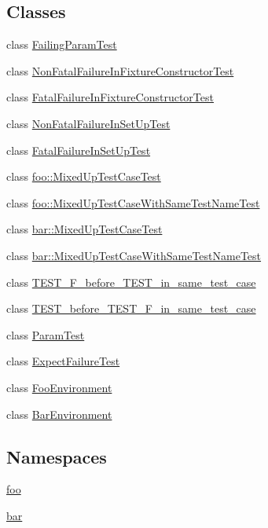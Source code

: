 \subsection*{Classes}
\begin{DoxyCompactItemize}
\item 
class \mbox{\hyperlink{classFailingParamTest}{Failing\+Param\+Test}}
\item 
class \mbox{\hyperlink{classNonFatalFailureInFixtureConstructorTest}{Non\+Fatal\+Failure\+In\+Fixture\+Constructor\+Test}}
\item 
class \mbox{\hyperlink{classFatalFailureInFixtureConstructorTest}{Fatal\+Failure\+In\+Fixture\+Constructor\+Test}}
\item 
class \mbox{\hyperlink{classNonFatalFailureInSetUpTest}{Non\+Fatal\+Failure\+In\+Set\+Up\+Test}}
\item 
class \mbox{\hyperlink{classFatalFailureInSetUpTest}{Fatal\+Failure\+In\+Set\+Up\+Test}}
\item 
class \mbox{\hyperlink{classfoo_1_1MixedUpTestCaseTest}{foo\+::\+Mixed\+Up\+Test\+Case\+Test}}
\item 
class \mbox{\hyperlink{classfoo_1_1MixedUpTestCaseWithSameTestNameTest}{foo\+::\+Mixed\+Up\+Test\+Case\+With\+Same\+Test\+Name\+Test}}
\item 
class \mbox{\hyperlink{classbar_1_1MixedUpTestCaseTest}{bar\+::\+Mixed\+Up\+Test\+Case\+Test}}
\item 
class \mbox{\hyperlink{classbar_1_1MixedUpTestCaseWithSameTestNameTest}{bar\+::\+Mixed\+Up\+Test\+Case\+With\+Same\+Test\+Name\+Test}}
\item 
class \mbox{\hyperlink{classTEST__F__before__TEST__in__same__test__case}{T\+E\+S\+T\+\_\+\+F\+\_\+before\+\_\+\+T\+E\+S\+T\+\_\+in\+\_\+same\+\_\+test\+\_\+case}}
\item 
class \mbox{\hyperlink{classTEST__before__TEST__F__in__same__test__case}{T\+E\+S\+T\+\_\+before\+\_\+\+T\+E\+S\+T\+\_\+\+F\+\_\+in\+\_\+same\+\_\+test\+\_\+case}}
\item 
class \mbox{\hyperlink{classParamTest}{Param\+Test}}
\item 
class \mbox{\hyperlink{classExpectFailureTest}{Expect\+Failure\+Test}}
\item 
class \mbox{\hyperlink{classFooEnvironment}{Foo\+Environment}}
\item 
class \mbox{\hyperlink{classBarEnvironment}{Bar\+Environment}}
\end{DoxyCompactItemize}
\subsection*{Namespaces}
\begin{DoxyCompactItemize}
\item 
 \mbox{\hyperlink{namespacefoo}{foo}}
\item 
 \mbox{\hyperlink{namespacebar}{bar}}
\end{DoxyCompactItemize}
